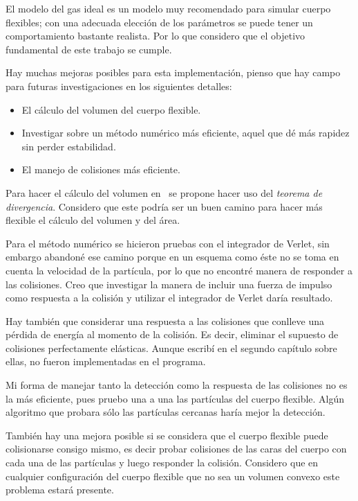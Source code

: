 El modelo del gas ideal es un modelo muy recomendado para simular cuerpo flexibles; con una adecuada elección de los parámetros se puede tener un comportamiento bastante realista.
Por lo que considero que el objetivo fundamental de este trabajo se cumple.

Hay muchas mejoras posibles para esta implementación, pienso que hay campo para futuras investigaciones en los siguientes detalles:

\begin{itemize}
 \item El cálculo del volumen del cuerpo flexible.
 \item Investigar sobre un método numérico más eficiente, aquel que dé más rapidez sin perder estabilidad.
 \item El manejo de colisiones más eficiente.
\end{itemize}

Para hacer el cálculo del volumen en~\cite{Matika:SoftBody} se propone hacer uso del \emph{teorema de divergencia}.
Considero que este podría ser un buen camino para hacer más flexible el cálculo del volumen y del área.

Para el método numérico se hicieron pruebas con el integrador de Verlet, sin embargo abandoné ese camino porque en un esquema como éste no se toma en cuenta la velocidad de la partícula, por lo que no encontré manera de responder a las colisiones.
Creo que investigar la manera de incluir una fuerza de impulso como respuesta a la colisión y utilizar el integrador de Verlet daría resultado.

Hay también que considerar una respuesta a las colisiones que conlleve una pérdida de energía al momento de la colisión.
Es decir, eliminar el supuesto de colisiones perfectamente elásticas.
Aunque escribí en el segundo capítulo sobre ellas, no fueron implementadas en el programa.

Mi forma de manejar tanto la detección como la respuesta de las colisiones  no es la más eficiente, pues pruebo una a una las partículas del cuerpo flexible.
Algún algoritmo que probara sólo las partículas cercanas haría mejor la detección.

También hay una mejora posible si se considera que el cuerpo flexible puede colisionarse consigo mismo, es decir probar colisiones de las caras del cuerpo con cada una de las partículas y luego responder la colisión.
Considero que en cualquier configuración del cuerpo flexible que no sea un volumen convexo este problema estará presente.
